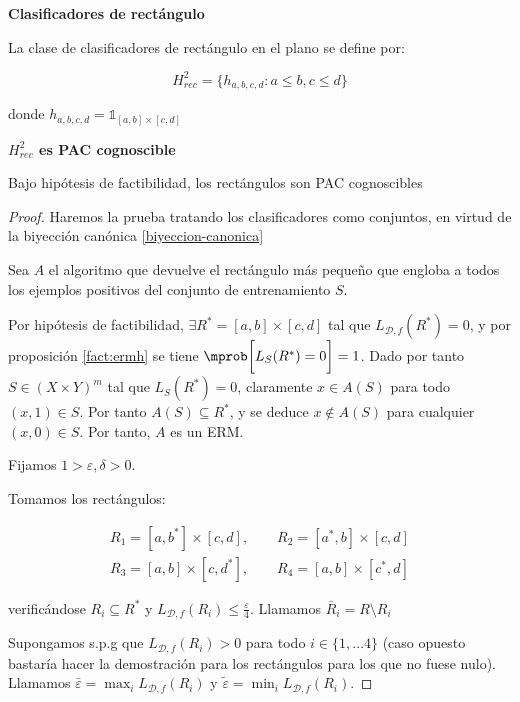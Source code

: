 \begin{example}
  \begin{definition} \textbf{Clasificadores de rectángulo}

  La clase de clasificadores de rectángulo en el plano se define por:

  \[H^2_{rec} = \{ h_{a,b,c,d}: a\le b, c\le d\}\]

  donde $h_{a,b,c,d} = \mathds{1}_{[a,b]\times [c,d]}$
  \end{definition}


  \begin{fact} \textbf{$H_{rec}^2$ es PAC cognoscible}

  Bajo hipótesis de factibilidad, los rectángulos son PAC cognoscibles
  \end{fact}

    \begin{proof}
    Haremos la prueba tratando los clasificadores como conjuntos, en virtud de la biyección canónica \eqref{biyeccion-canonica}
    
    Sea $A$ el algoritmo que devuelve el rectángulo más pequeño que engloba a todos los ejemplos positivos del conjunto 
    de entrenamiento $S$.

    Por hipótesis de factibilidad, $\exists R^\ast = [a,b]\times [c,d]$ tal que $L_{\mathcal{D},f}(R^\ast) = 0$, y por 
    proposición \ref{fact:ermh} se tiene $\mprob \bigg[L_S(R^\ast) = 0 \bigg] = 1$. 
    Dado por tanto $S \in (X\times Y)^m$ tal que $L_S(R^\ast) = 0$, claramente $x \in A(S)$ para 
    todo $(x,1)\in S$. Por tanto $A(S) \subseteq R^\ast$, y se deduce $x \notin A(S)$ para 
    cualquier $(x,0)\in S$. Por tanto, $A$ es un ERM.

    Fijamos $1 > \varepsilon, \delta > 0$.

    Tomamos los rectángulos:
    
    \begin{align*} 
    R_1 = [a,b^{\ast}] \times [c,d], \qquad R_2= [a^{\ast},b] \times [c,d] \\ 
    R_3=[a,b] \times [c,d^{\ast}],   \qquad R_4=[a,b] \times [c^{\ast},d]     
    \end{align*}
 
    verificándose $R_i \subseteq R^\ast$ y $L_{\mathcal{D},f}(R_i) \le \frac{\varepsilon}{4}$. Llamamos 
    $\bar{R}_i = R\setminus R_i$
    
    Supongamos s.p.g que $L_{\mathcal{D},f}(R_i) > 0$ para todo $i\in\{1,\ldots 4\}$ (caso opuesto 
    bastaría hacer la demostración para los rectángulos para los que no fuese nulo). Llamamos 
    $\bar{\varepsilon} = \max_i L_{\mathcal{D},f}(R_i)$ y $\widetilde{\varepsilon} = \min_i L_{\mathcal{D},f}(R_i)$.


\end{proof}
\end{example}
